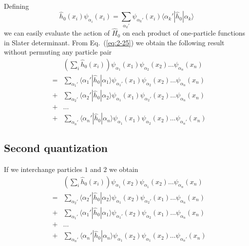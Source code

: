 \documentclass[%
twoside,                 %
final,                   %
10pt]{article}
\begin{document}
\paragraph{}
Defining
\begin{equation}
	\hat{h}_0(x_i) \psi_{\alpha_i}(x_i) = \sum_{\alpha_k'} \psi_{\alpha_k'}(x_i) \langle\alpha_k'|\hat{h}_0|\alpha_k\rangle \label{eq:2-25}
\end{equation}
we can easily  evaluate the action of $\hat{H}_0$ on each product of one-particle functions in Slater determinant.
From Eq.~(\ref{eq:2-25})  we obtain the following result without  permuting any particle pair 
\begin{eqnarray}
	&& \left( \sum_i \hat{h}_0(x_i) \right) \psi_{\alpha_1}(x_1)\psi_{\alpha_2}(x_2) \dots \psi_{\alpha_n}(x_n) \nonumber \\
	& =&\sum_{\alpha_1'} \langle \alpha_1'|\hat{h}_0|\alpha_1\rangle 
		\psi_{\alpha_1'}(x_1)\psi_{\alpha_2}(x_2) \dots \psi_{\alpha_n}(x_n) \nonumber \\
	&+&\sum_{\alpha_2'} \langle \alpha_2'|\hat{h}_0|\alpha_2\rangle
		\psi_{\alpha_1}(x_1)\psi_{\alpha_2'}(x_2) \dots \psi_{\alpha_n}(x_n) \nonumber \\
	&+& \dots \nonumber \\
	&+&\sum_{\alpha_n'} \langle \alpha_n'|\hat{h}_0|\alpha_n\rangle
		\psi_{\alpha_1}(x_1)\psi_{\alpha_2}(x_2) \dots \psi_{\alpha_n'}(x_n) \label{eq:2-26}
\end{eqnarray}



\subsection*{Second quantization}

\paragraph{}
If we interchange particles $1$ and $2$  we obtain
\begin{eqnarray}
	&& \left( \sum_i \hat{h}_0(x_i) \right) \psi_{\alpha_1}(x_2)\psi_{\alpha_1}(x_2) \dots \psi_{\alpha_n}(x_n) \nonumber \\
	& =&\sum_{\alpha_2'} \langle \alpha_2'|\hat{h}_0|\alpha_2\rangle 
		\psi_{\alpha_1}(x_2)\psi_{\alpha_2'}(x_1) \dots \psi_{\alpha_n}(x_n) \nonumber \\
	&+&\sum_{\alpha_1'} \langle \alpha_1'|\hat{h}_0|\alpha_1\rangle
		\psi_{\alpha_1'}(x_2)\psi_{\alpha_2}(x_1) \dots \psi_{\alpha_n}(x_n) \nonumber \\
	&+& \dots \nonumber \\
	&+&\sum_{\alpha_n'} \langle \alpha_n'|\hat{h}_0|\alpha_n\rangle
		\psi_{\alpha_1}(x_2)\psi_{\alpha_1}(x_2) \dots \psi_{\alpha_n'}(x_n) \label{eq:2-27}
\end{eqnarray}
\end{document}

